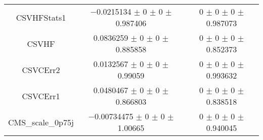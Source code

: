 \begin{table}
\begin{tabular}{ccc}
CSVHFStats1 & \num{-0.0215134} $\pm$ \num{0} $\pm$ \num{0} $\pm$ \num{0.987406} & \num{0} $\pm$ \num{0} $\pm$ \num{0} $\pm$ \num{0.987073}\\
CSVHF & \num{0.0836259} $\pm$ \num{0} $\pm$ \num{0} $\pm$ \num{0.885858} & \num{0} $\pm$ \num{0} $\pm$ \num{0} $\pm$ \num{0.852373}\\
CSVCErr2 & \num{0.0132567} $\pm$ \num{0} $\pm$ \num{0} $\pm$ \num{0.99059} & \num{0} $\pm$ \num{0} $\pm$ \num{0} $\pm$ \num{0.993632}\\
CSVCErr1 & \num{0.0480467} $\pm$ \num{0} $\pm$ \num{0} $\pm$ \num{0.866803} & \num{0} $\pm$ \num{0} $\pm$ \num{0} $\pm$ \num{0.838518}\\
CMS\_scale\_0p75j & \num{-0.00734475} $\pm$ \num{0} $\pm$ \num{0} $\pm$ \num{1.00665} & \num{0} $\pm$ \num{0} $\pm$ \num{0} $\pm$ \num{0.940045}\\
\bottomrule
\end{tabular}
\end{table}